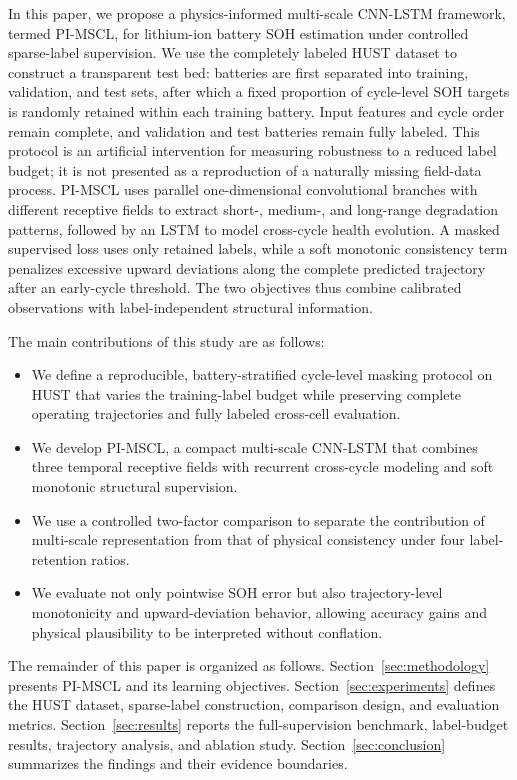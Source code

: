 \documentclass[a4paper,fleqn]{cas-dc}
\begin{document}
In this paper, we propose a physics-informed multi-scale CNN-LSTM framework, termed PI-MSCL, for lithium-ion battery SOH estimation under controlled sparse-label supervision. We use the completely labeled HUST dataset to construct a transparent test bed: batteries are first separated into training, validation, and test sets, after which a fixed proportion of cycle-level SOH targets is randomly retained within each training battery. Input features and cycle order remain complete, and validation and test batteries remain fully labeled. This protocol is an artificial intervention for measuring robustness to a reduced label budget; it is not presented as a reproduction of a naturally missing field-data process. PI-MSCL uses parallel one-dimensional convolutional branches with different receptive fields to extract short-, medium-, and long-range degradation patterns, followed by an LSTM to model cross-cycle health evolution. A masked supervised loss uses only retained labels, while a soft monotonic consistency term penalizes excessive upward deviations along the complete predicted trajectory after an early-cycle threshold. The two objectives thus combine calibrated observations with label-independent structural information.

The main contributions of this study are as follows:
\begin{itemize}
  \item We define a reproducible, battery-stratified cycle-level masking protocol on HUST that varies the training-label budget while preserving complete operating trajectories and fully labeled cross-cell evaluation.
  \item We develop PI-MSCL, a compact multi-scale CNN-LSTM that combines three temporal receptive fields with recurrent cross-cycle modeling and soft monotonic structural supervision.
  \item We use a controlled two-factor comparison to separate the contribution of multi-scale representation from that of physical consistency under four label-retention ratios.
  \item We evaluate not only pointwise SOH error but also trajectory-level monotonicity and upward-deviation behavior, allowing accuracy gains and physical plausibility to be interpreted without conflation.
\end{itemize}

The remainder of this paper is organized as follows. Section~\ref{sec:methodology} presents PI-MSCL and its learning objectives. Section~\ref{sec:experiments} defines the HUST dataset, sparse-label construction, comparison design, and evaluation metrics. Section~\ref{sec:results} reports the full-supervision benchmark, label-budget results, trajectory analysis, and ablation study. Section~\ref{sec:conclusion} summarizes the findings and their evidence boundaries.
\end{document}
